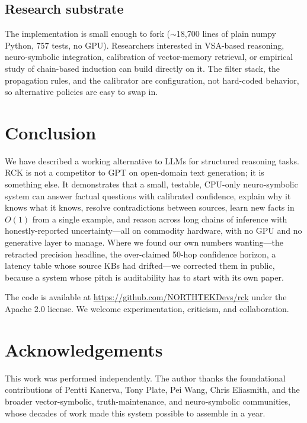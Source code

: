 \documentclass[11pt]{article}
\begin{document}
\subsection{Research substrate}

The implementation is small enough to fork ($\sim$18{,}700 lines of
plain numpy Python, 757 tests, no GPU). Researchers interested in
VSA-based reasoning, neuro-symbolic integration, calibration of
vector-memory retrieval, or empirical study of chain-based induction
can build directly on it. The filter stack, the propagation rules,
and the calibrator are configuration, not hard-coded behavior, so
alternative policies are easy to swap in.

\section{Conclusion}

We have described a working alternative to LLMs for structured
reasoning tasks. RCK is not a competitor to GPT on open-domain text
generation; it is something else. It demonstrates that a small,
testable, CPU-only neuro-symbolic system can answer factual
questions with calibrated confidence, explain why it knows what it
knows, resolve contradictions between sources, learn new facts in
$O(1)$ from a single example, and reason across long chains of
inference with honestly-reported uncertainty---all on commodity
hardware, with no GPU and no generative layer to manage. Where we
found our own numbers wanting---the retracted precision headline,
the over-claimed 50-hop confidence horizon, a latency table whose
source KBs had drifted---we corrected them in public, because a
system whose pitch is auditability has to start with its own paper.

The code is available at \url{https://github.com/NORTHTEKDevs/rck}
under the Apache 2.0 license. We welcome experimentation, criticism, and
collaboration.

\section*{Acknowledgements}

This work was performed independently. The author thanks the
foundational contributions of Pentti Kanerva, Tony Plate, Pei Wang,
Chris Eliasmith, and the broader vector-symbolic,
truth-maintenance, and neuro-symbolic communities, whose decades of
work made this system possible to assemble in a year.



\end{document}
